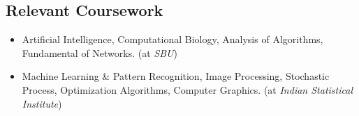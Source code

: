 \documentclass{res}
\begin{document}
\begin{resume}
\section{Relevant Coursework} 
\begin{itemize}
\item Artificial Intelligence,  Computational Biology, Analysis of Algorithms, Fundamental of Networks. (at {\it SBU})
\item Machine Learning \& Pattern Recognition, Image Processing, Stochastic Process, Optimization Algorithms, Computer Graphics. (at {\it
Indian Statistical Institute})
\end{itemize}



\end{resume}
\end{document}
